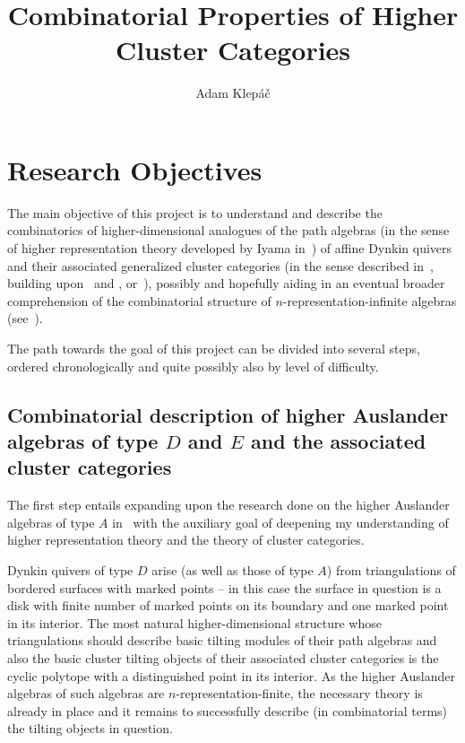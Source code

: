 \documentclass[a4paper,oneside,svgnames]{amsart}
\title{Combinatorial Properties of Higher Cluster Categories}
\author{Adam Klepáč}
\theoremstyle{plain}
\theoremstyle{definition}
\begin{document}
 \maketitle
 \section*{Research Objectives}
 \setcounter{section}{1}

 The main objective of this project is to understand and describe the
 combinatorics of higher-dimension\-al analogues of the path algebras (in the
 sense of higher representation theory developed by Iyama in~\cite{iya}) of
 affine Dynkin quivers and their associated generalized cluster categories (in
 the sense described in~\cite[Section~5]{ot}, building upon~\cite{amiot1} and
 \cite{amiot2}, or~\cite{guo}), possibly and hopefully aiding in an eventual
 broader comprehension of the combinatorial structure of
 $n$-representation-infinite algebras (see~\cite{hio}).

 The path towards the goal of this project can be divided into several steps,
 ordered chronologically and quite possibly also by level of difficulty.
 
 \subsection{Combinatorial description of higher Auslander algebras of type $D$
 and $E$ and the associated cluster categories}

 The first step entails expanding upon the research done on the higher Auslander
 algebras of type $A$ in~\cite{ot} with the auxiliary goal of deepening my
 understanding of higher representation theory and the theory of cluster
 categories.

 Dynkin quivers of type $D$ arise (as well as those of type $A$) from
 triangulations of bordered surfaces with marked points -- in this case the
 surface in question is a disk with finite number of marked points on its
 boundary and one marked point in its interior. The most natural
 higher-dimensional structure whose triangulations should describe basic tilting
 modules of their path algebras and also the basic cluster tilting objects of
 their associated cluster categories is the cyclic polytope with a distinguished
 point in its interior. As the higher Auslander algebras of such algebras are
 $n$-representation-finite, the necessary theory is already in place and it
 remains to successfully describe (in combinatorial terms) the tilting objects
 in question.
\end{document}
